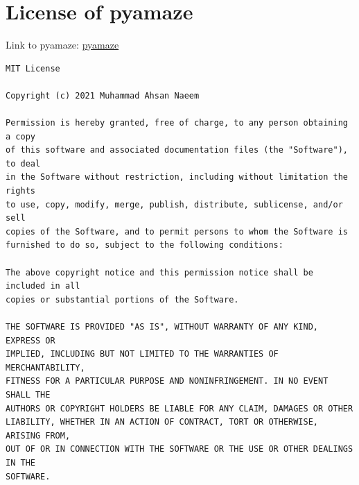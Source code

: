 \documentclass{article}
\begin{document}
\section{License of pyamaze}
Link to pyamaze: \href{https://github.com/MAN1986/pyamaze}{pyamaze}
\begin{verbatim}
MIT License

Copyright (c) 2021 Muhammad Ahsan Naeem

Permission is hereby granted, free of charge, to any person obtaining a copy
of this software and associated documentation files (the "Software"), to deal
in the Software without restriction, including without limitation the rights
to use, copy, modify, merge, publish, distribute, sublicense, and/or sell
copies of the Software, and to permit persons to whom the Software is
furnished to do so, subject to the following conditions:

The above copyright notice and this permission notice shall be included in all
copies or substantial portions of the Software.

THE SOFTWARE IS PROVIDED "AS IS", WITHOUT WARRANTY OF ANY KIND, EXPRESS OR
IMPLIED, INCLUDING BUT NOT LIMITED TO THE WARRANTIES OF MERCHANTABILITY,
FITNESS FOR A PARTICULAR PURPOSE AND NONINFRINGEMENT. IN NO EVENT SHALL THE
AUTHORS OR COPYRIGHT HOLDERS BE LIABLE FOR ANY CLAIM, DAMAGES OR OTHER
LIABILITY, WHETHER IN AN ACTION OF CONTRACT, TORT OR OTHERWISE, ARISING FROM,
OUT OF OR IN CONNECTION WITH THE SOFTWARE OR THE USE OR OTHER DEALINGS IN THE
SOFTWARE.
\end{verbatim}
\end{document}
